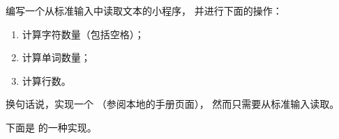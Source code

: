 \begin{Exercise}[title={单词和字母统计},difficulty=0]
\label{ex:wc}
\Question\label{ex:wc q1}编写一个从标准输入中读取文本的小程序，
并进行下面的操作：
\begin{enumerate}
\item{计算字符数量（包括空格）；}
\item{计算单词数量；}
\item{计算行数。}
\end{enumerate}
换句话说，实现一个 （参阅本地的手册页面），
然而只需要从标准输入读取。
\end{Exercise}

\begin{Answer}
\Question 下面是  的一种实现。

\showremarks
\end{Answer}
